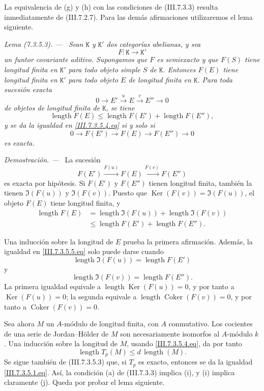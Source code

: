 \documentclass[10pt,oneside]{book}
\newcommand{\cat}[1]{\mathtt{#1}}
\newcommand{\Ker}{\operatorname{Ker}}
\newcommand{\Coker}{\operatorname{Coker}}
\newcommand{\sref}[2][]{\textup{(#2)}}
\newcommand{\oldpage}[2][]{\setcounter{footnote}{0}\marginpar{\scriptsize\textbf{#1}~|~#2}\ignorespaces}
\newenvironment{lemma}[1][]{\par\medskip\noindent\itshape Lema (#1). ---\ }{\par}
\newenvironment{proof}{\par\medskip\noindent\textit{Demostración. ---\ }}{\par}
\begin{document}
La equivalencia de (g) y (h) con las condiciones de
\sref{III.7.3.3} resulta inmediatamente de \sref{III.7.2.7}. Para
las demás afirmaciones utilizaremos el lema siguiente.

\begin{lemma}[7.3.5.3]
\label{III.7.3.5.3}
Sean $\cat{K}$ y $\cat{K}'$ dos categorías abelianas, y sea
\[
  F:\cat{K}\longrightarrow\cat{K}'
\]
un funtor covariante aditivo. Supongamos que $F$ es semiexacto y que
$F(S)$ tiene longitud finita en $\cat{K}'$ para todo objeto simple
$S$ de $\cat{K}$. Entonces $F(E)$ tiene longitud finita en
$\cat{K}'$ para todo objeto $E$ de longitud finita en $\cat{K}$.
Para toda sucesión exacta
\[
  0\longrightarrow E'
  \xrightarrow{u}E
  \xrightarrow{v}E''
  \longrightarrow0
\]
de objetos de longitud finita de $\cat{K}$, se tiene
\[
  \operatorname{length}F(E)
  \leq
  \operatorname{length}F(E')
  +
  \operatorname{length}F(E''),
  \tag{7.3.5.4}\label{III.7.3.5.4.eq}
\]
y se da la igualdad en \eqref{III.7.3.5.4.eq} si y solo si
\[
  0\longrightarrow F(E')
  \longrightarrow F(E)
  \longrightarrow F(E'')
  \longrightarrow0
\]
es exacta.
\end{lemma}

\begin{proof}
La sucesión
\[
  F(E')\xrightarrow{F(u)}F(E)\xrightarrow{F(v)}F(E'')
\]
es exacta por hipótesis. Si $F(E')$ y $F(E'')$ tienen longitud
finita, también la tienen $\Im(F(u))$ y $\Im(F(v))$. Puesto que
$\Ker(F(v))=\Im(F(u))$, el objeto $F(E)$ tiene longitud finita, y
\[
  \begin{split}
  \operatorname{length}F(E)
  &=
  \operatorname{length}\Im(F(u))
  +
  \operatorname{length}\Im(F(v))
  \\
  &\leq
  \operatorname{length}F(E')
  +
  \operatorname{length}F(E'').
  \end{split}
  \tag{7.3.5.5}\label{III.7.3.5.5.eq}
\]

\oldpage[III]{183}

Una inducción sobre la longitud de $E$ prueba la primera
afirmación. Además, la igualdad en \eqref{III.7.3.5.5.eq} solo
puede darse cuando
\[
  \operatorname{length}\Im(F(u))
  =
  \operatorname{length}F(E')
\]
y
\[
  \operatorname{length}\Im(F(v))
  =
  \operatorname{length}F(E'').
\]
La primera igualdad equivale a
$\operatorname{length}\Ker(F(u))=0$, y por tanto a $\Ker(F(u))=0$;
la segunda equivale a $\operatorname{length}\Coker(F(v))=0$, y por
tanto a $\Coker(F(v))=0$.
\end{proof}

Sea ahora $M$ un $A$-módulo de longitud finita, con $A$
conmutativo. Los cocientes de una serie de Jordan--Hölder de $M$
son necesariamente isomorfos al $A$-módulo $k$. Una inducción
sobre la longitud de $M$, usando \eqref{III.7.3.5.4.eq}, da por
tanto
\[
  \operatorname{length}T_p(M)
  \leq
  d\,\operatorname{length}(M).
  \tag{7.3.5.6}\label{III.7.3.5.6.eq}
\]
Se sigue también de \sref{III.7.3.5.3} que, si $T_p$ es exacto,
entonces se da la igualdad \eqref{III.7.3.5.1.eq}. Así, la condición
(a) de \sref{III.7.3.3} implica (i), y (i) implica claramente (j).
Queda por probar el lema siguiente.
\end{document}
